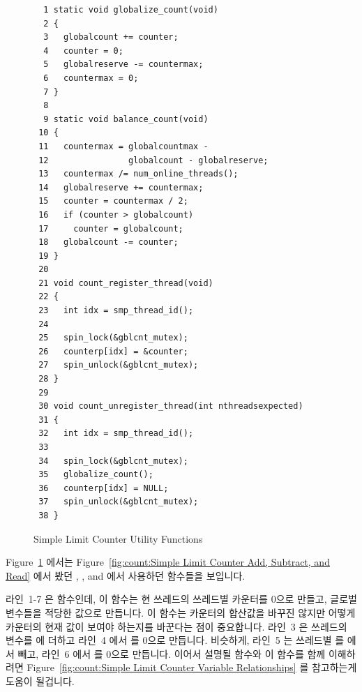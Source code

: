 \begin{figure}[tbp]
{ \scriptsize
\begin{verbatim}
  1 static void globalize_count(void)
  2 {
  3   globalcount += counter;
  4   counter = 0;
  5   globalreserve -= countermax;
  6   countermax = 0;
  7 }
  8 
  9 static void balance_count(void)
 10 {
 11   countermax = globalcountmax -
 12                globalcount - globalreserve;
 13   countermax /= num_online_threads();
 14   globalreserve += countermax;
 15   counter = countermax / 2;
 16   if (counter > globalcount)
 17     counter = globalcount;
 18   globalcount -= counter;
 19 }
 20 
 21 void count_register_thread(void)
 22 {
 23   int idx = smp_thread_id();
 24 
 25   spin_lock(&gblcnt_mutex);
 26   counterp[idx] = &counter;
 27   spin_unlock(&gblcnt_mutex);
 28 }
 29 
 30 void count_unregister_thread(int nthreadsexpected)
 31 {
 32   int idx = smp_thread_id();
 33 
 34   spin_lock(&gblcnt_mutex);
 35   globalize_count();
 36   counterp[idx] = NULL;
 37   spin_unlock(&gblcnt_mutex);
 38 }
\end{verbatim}
}
\caption{Simple Limit Counter Utility Functions}
\label{fig:count:Simple Limit Counter Utility Functions}
\end{figure}

Figure~\ref{fig:count:Simple Limit Counter Utility Functions} 에서는
Figure~\ref{fig:count:Simple Limit Counter Add, Subtract, and Read} 에서 봤던 
, , and  에서 사용하던
함수들을 보입니다.

라인~1-7 은  함수인데, 이 함수는 현 쓰레드의 쓰레드별
카운터를 0으로 만들고, 글로벌 변수들을 적당한 값으로 만듭니다.
이 함수는 카운터의 합산값을 바꾸진 않지만 어떻게 카운터의 현재 값이 보여야
하는지를 바꾼다는 점이 중요합니다.
라인~3 은 쓰레드의  변수를  에 더하고 라인~4 에서
 를 0으로 만듭니다.
비슷하게, 라인~5 는 쓰레드별  를  에서 빼고,
라인~6 에서  를 0으로 만듭니다.
이어서 설명될  함수와 이 함수를 함께 이해하려면
Figure~\ref{fig:count:Simple Limit Counter Variable Relationships}
를 참고하는게 도움이 될겁니다.

